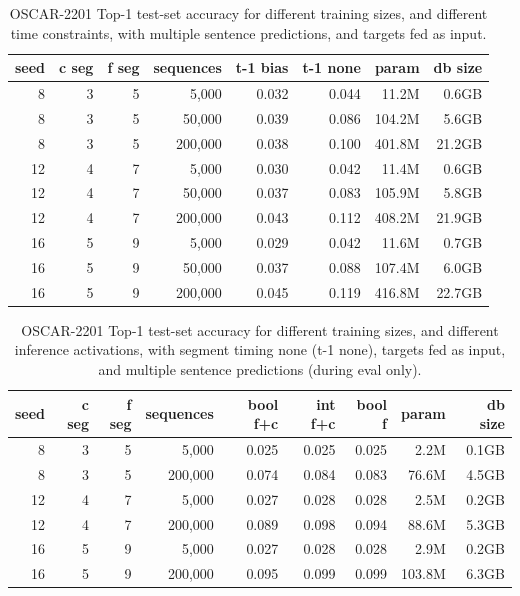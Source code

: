 \begin{table}[H]
\centering
\caption{OSCAR-2201 Top-1 test-set accuracy for different training sizes, and different time constraints, with multiple sentence predictions, and targets fed as input.}
\label{tab:oscar-test-top1-accuracy-useBenchmarkDefaultsFalse-multisentencePredictions}
\begin{tabular}{rrrrrrrr}
\toprule
\textbf{seed} & \textbf{c seg} & \textbf{f seg} & \textbf{sequences} & \textbf{t-1 bias} & \textbf{t-1 none} & \textbf{param} & \textbf{db size} \\
\midrule
8 & 3 & 5 & 5,000     & 0.032 & 0.044 & 11.2M & 0.6GB \\
8 & 3 & 5 & 50,000    & 0.039 & 0.086 & 104.2M & 5.6GB \\
8 & 3 & 5 & 200,000   & 0.038 & 0.100 & 401.8M & 21.2GB \\
12 & 4 & 7 & 5,000    & 0.030 & 0.042 & 11.4M & 0.6GB \\
12 & 4 & 7 & 50,000   & 0.037 & 0.083 & 105.9M & 5.8GB \\
12 & 4 & 7 & 200,000  & 0.043 & 0.112 & 408.2M & 21.9GB \\
16 & 5 & 9 & 5,000    & 0.029 & 0.042 & 11.6M & 0.7GB \\
16 & 5 & 9 & 50,000   & 0.037 & 0.088 & 107.4M & 6.0GB \\
16 & 5 & 9 & 200,000  & 0.045 & 0.119 & 416.8M & 22.7GB \\
\bottomrule
\end{tabular}
\end{table}

\begin{table}[H]
\centering
\caption{OSCAR-2201 Top-1 test-set accuracy for different training sizes, and different inference activations, with segment timing none (t-1 none), targets fed as input, and multiple sentence predictions (during eval only).}
\label{tab:oscar-test-top1-accuracy-spacyPipelineOptimisations-inferenceActivations-multisentencePredictionsInference}
\begin{tabular}{rrrrrrrrr}
\toprule
\textbf{seed} & \textbf{c seg} & \textbf{f seg} & \textbf{sequences} & \textbf{bool f+c} & \textbf{int f+c} & \textbf{bool f} & \textbf{param} & \textbf{db size} \\
\midrule
8 & 3 & 5 & 5,000     & 0.025 & 0.025 & 0.025 & 2.2M & 0.1GB \\
8 & 3 & 5 & 200,000   & 0.074 & 0.084 & 0.083 & 76.6M & 4.5GB \\
12 & 4 & 7 & 5,000    & 0.027 & 0.028 & 0.028 & 2.5M & 0.2GB \\
12 & 4 & 7 & 200,000  & 0.089 & 0.098 & 0.094 & 88.6M & 5.3GB \\
16 & 5 & 9 & 5,000    & 0.027 & 0.028 & 0.028 & 2.9M & 0.2GB \\
16 & 5 & 9 & 200,000  & 0.095 & 0.099 & 0.099 & 103.8M & 6.3GB \\
\bottomrule
\end{tabular}
\end{table}


